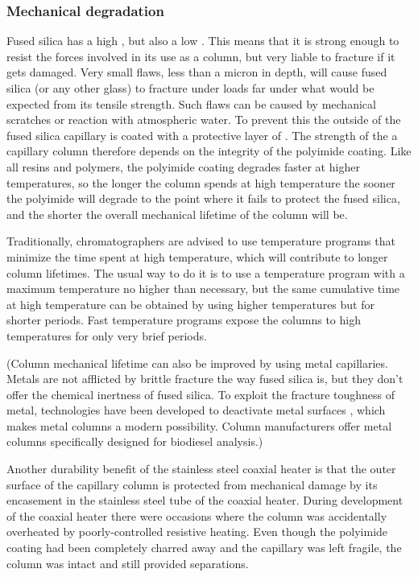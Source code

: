 \subsubsection{Mechanical degradation}
Fused silica has a high , but also a low
. This means that it is strong enough to resist the
forces involved in its use as a column, but very liable to fracture if it gets
damaged. Very small flaws, less than a micron in depth, will cause fused silica
(or any other glass) to fracture under loads far under what would be expected
from its tensile strength. Such flaws can be caused by mechanical scratches or
reaction with atmospheric water. To prevent this the outside of the fused silica
capillary is coated with a protective layer of . The
strength of the a capillary column therefore depends on the integrity of the
polyimide coating. Like all resins and polymers, the polyimide coating degrades
faster at higher temperatures, so the longer the column spends at high
temperature the sooner the polyimide will degrade to the point where it fails to
protect the fused silica, and the shorter the overall mechanical lifetime of the
column will be.

Traditionally, chromatographers are advised to use temperature programs that
minimize the time spent at high temperature, which will contribute to longer
column lifetimes. The usual way to do it is to use a temperature program with
a maximum temperature no higher than necessary, but the same cumulative time at
high temperature can be obtained by using higher temperatures but for shorter
periods. Fast temperature programs expose the columns to high temperatures for
only very brief periods.

(Column mechanical lifetime can also be improved by using metal capillaries.
Metals are not afflicted by brittle fracture the way fused silica is, but they
don't offer the chemical inertness of fused silica. To exploit the fracture
toughness of metal, technologies have been developed to deactivate metal surfaces
\autocite{Rohwer1986, Smith2002}, which makes metal columns a modern
possibility. Column manufacturers offer metal columns specifically designed for
biodiesel analysis.)

Another durability benefit of the stainless steel coaxial heater is that the
outer surface of the capillary column is protected from mechanical damage by its
encasement in the stainless steel tube of the coaxial heater. During development
of the coaxial heater there were occasions where the column was accidentally
overheated by poorly-controlled resistive heating. Even though the polyimide
coating had been completely charred away and the capillary was left fragile, the
column was intact and still provided separations.

